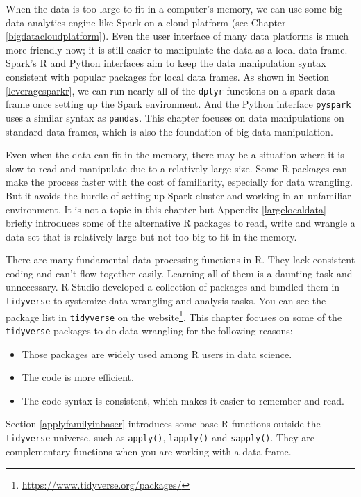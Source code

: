 \documentclass[12pt,]{krantz}
\providecommand{\tightlist}{%
  \setlength{\itemsep}{0pt}\setlength{\parskip}{0pt}}
\renewcommand{\href}[2]{#2\footnote{\url{#1}}}
\begin{document}
When the data is too large to fit in a computer's memory, we can use some big data analytics engine like Spark on a cloud platform (see Chapter \ref{bigdatacloudplatform}). Even the user interface of many data platforms is much more friendly now; it is still easier to manipulate the data as a local data frame. Spark's R and Python interfaces aim to keep the data manipulation syntax consistent with popular packages for local data frames. As shown in Section \ref{leveragesparkr}, we can run nearly all of the \texttt{dplyr} functions on a spark data frame once setting up the Spark environment. And the Python interface \texttt{pyspark} uses a similar syntax as \texttt{pandas}. This chapter focuses on data manipulations on standard data frames, which is also the foundation of big data manipulation.

Even when the data can fit in the memory, there may be a situation where it is slow to read and manipulate due to a relatively large size. Some R packages can make the process faster with the cost of familiarity, especially for data wrangling. But it avoids the hurdle of setting up Spark cluster and working in an unfamiliar environment. It is not a topic in this chapter but Appendix \ref{largelocaldata} briefly introduces some of the alternative R packages to read, write and wrangle a data set that is relatively large but not too big to fit in the memory.

There are many fundamental data processing functions in R. They lack consistent coding and can't flow together easily. Learning all of them is a daunting task and unnecessary. R Studio developed a collection of packages and bundled them in \texttt{tidyverse} to systemize data wrangling and analysis tasks. You can see the package list in \texttt{tidyverse} on the \href{https://www.tidyverse.org/packages/}{website}. This chapter focuses on some of the \texttt{tidyverse} packages to do data wrangling for the following reasons:

\begin{itemize}
\tightlist
\item
  Those packages are widely used among R users in data science.
\item
  The code is more efficient.
\item
  The code syntax is consistent, which makes it easier to remember and read.
\end{itemize}

Section \ref{applyfamilyinbaser} introduces some base R functions outside the \texttt{tidyverse} universe, such as \texttt{apply()}, \texttt{lapply()} and \texttt{sapply()}. They are complementary functions when you are working with a data frame.
\end{document}
